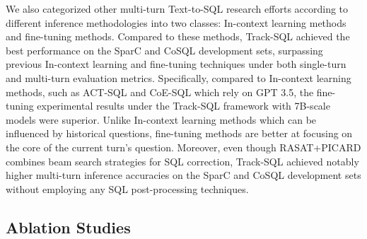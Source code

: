 \documentclass[11pt]{article}
\begin{document}
We also categorized other multi-turn Text-to-SQL research efforts according to different inference methodologies into two classes: In-context learning methods and fine-tuning methods. Compared to these methods, Track-SQL achieved the best performance on the SparC and CoSQL development sets, surpassing previous In-context learning and fine-tuning techniques under both single-turn and multi-turn evaluation metrics. Specifically, compared to In-context learning methods, such as ACT-SQL and CoE-SQL which rely on GPT 3.5, the fine-tuning experimental results under the Track-SQL framework with 7B-scale models were superior. Unlike In-context learning methods which can be influenced by historical questions, fine-tuning methods are better at focusing on the core of the current turn's question. Moreover, even though RASAT+PICARD combines beam search strategies for SQL correction, 
Track-SQL achieved notably higher multi-turn inference accuracies on the SparC and CoSQL development sets without employing any SQL post-processing techniques.

\subsection{Ablation Studies}
\begin{table}
    \centering
    \large
    \renewcommand\arraystretch{1.3}
    \caption{Ablation result on SparC dev set.}
    \label{tab:ablation_result_on_sparc}
\end{table}
\end{document}

